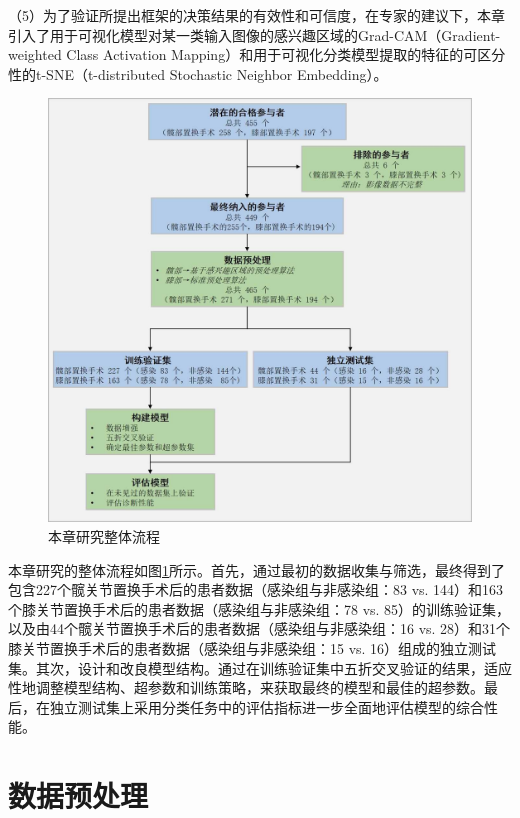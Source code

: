（5）为了验证所提出框架的决策结果的有效性和可信度，在专家的建议下，本章引入了用于可视化模型对某一类输入图像的感兴趣区域的Grad-CAM（Gradient-weighted Class Activation Mapping）\cite{selvaraju2017grad}和用于可视化分类模型提取的特征的可区分性的t-SNE（t-distributed Stochastic Neighbor Embedding）\cite{van2008visualizing}。

\begin{figure}[htbp]
  \centering
  \includegraphics[width=\textwidth]{figures/chap03_workflow.jpg}
  \caption{本章研究整体流程}
  \label{fig:chap03_workflow}
\end{figure}

本章研究的整体流程如图\ref{fig:chap03_workflow}所示。首先，通过最初的数据收集与筛选，最终得到了包含227个髋关节置换手术后的患者数据（感染组与非感染组：83 vs. 144）和163个膝关节置换手术后的患者数据（感染组与非感染组：78 vs. 85）的训练验证集，以及由44个髋关节置换手术后的患者数据（感染组与非感染组：16 vs. 28）和31个膝关节置换手术后的患者数据（感染组与非感染组：15 vs. 16）组成的独立测试集。其次，设计和改良模型结构。通过在训练验证集中五折交叉验证的结果，适应性地调整模型结构、超参数和训练策略，来获取最终的模型和最佳的超参数。最后，在独立测试集上采用分类任务中的评估指标进一步全面地评估模型的综合性能。

\section{数据预处理}

